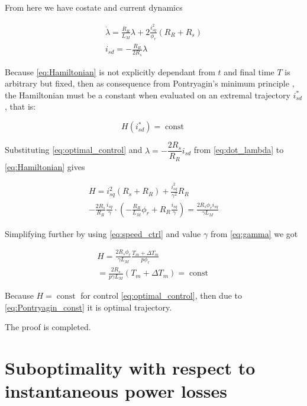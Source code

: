 \documentclass[journal]{IEEEtran}
\DeclareMathOperator{\const}{const}
\begin{document}
From here we have costate and current dynamics

\begin{equation}\label{eq:dot_lambda}
\begin{gathered}
 \dot \lambda = \frac{R_R}{L_M} \lambda + 2 \frac{i_{sq}^2}{\phi_r} (R_R + R_s) \\
 i_{sd} = -\frac{R_R}{2 R_s} \lambda
\end{gathered}
\end{equation}

Because \eqref{eq:Hamiltonian} is not explicitly dependant from $t$ and final time $T$ is arbitrary but fixed, then as consequence from Pontryagin's minimum principle \cite{9}, the Hamiltonian must be a constant when evaluated on an extremal trajectory $i_{sd}^*$, that is: 

\begin{equation}\label{eq:Pontryagin_const}
 H(i_{sd}^*) = \const
\end{equation}

Substituting \eqref{eq:optimal_control} and $\lambda = -\dfrac{2 R_s}{R_R} i_{sd}$ from \eqref{eq:dot_lambda} to \eqref{eq:Hamiltonian} gives

\begin{equation}
\begin{gathered}
H = i_{sq}^2 (R_s + R_R) + \frac{i_{sq}^2}{\gamma^2} R_R \\
- \frac{2 R_s}{R_R} \frac{i_{sq}}{\gamma} \cdot \left ( -\frac{R_R}{L_M} \phi_r + R_R \frac{i_{sq}}{\gamma} \right ) = \frac{2 R_s \phi_r i_{sq}}{\gamma L_M}
\end{gathered}
\end{equation}

Simplifying further by using \eqref{eq:speed_ctrl} and value $\gamma$ from \eqref{eq:gamma} we got

\begin{equation}
\begin{gathered}
H = \frac{2 R_s \phi_r }{\gamma L_M} \frac{T_m+\Delta T_m}{p \phi_r} \\
= \frac{2 R_s}{p \gamma L_M}(T_m+\Delta T_m) = \const
\end{gathered}
\end{equation}

Because $H = \const$ for control \eqref{eq:optimal_control}, then due to \eqref{eq:Pontryagin_const} it is optimal trajectory.

The proof is completed.

\section{Suboptimality with respect to instantaneous power losses}
\end{document}
